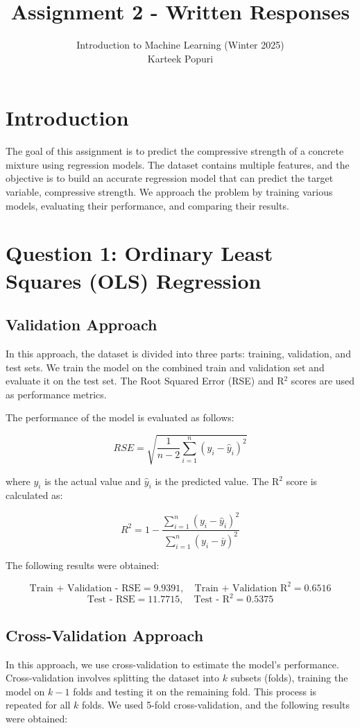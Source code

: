 \documentclass[a4paper,12pt]{article}
\title{Assignment 2 - Written Responses}
\author{Introduction to Machine Learning (Winter 2025)\\ Karteek Popuri}
\date{}
\begin{document}
\maketitle



\section*{Introduction}
The goal of this assignment is to predict the compressive strength of a concrete mixture using regression models. The dataset contains multiple features, and the objective is to build an accurate regression model that can predict the target variable, compressive strength. We approach the problem by training various models, evaluating their performance, and comparing their results.

\section*{Question 1: Ordinary Least Squares (OLS) Regression}

\subsection*{Validation Approach}
In this approach, the dataset is divided into three parts: training, validation, and test sets. We train the model on the combined train and validation set and evaluate it on the test set. The Root Squared Error (RSE) and R\(^2\) scores are used as performance metrics.

The performance of the model is evaluated as follows:

\[
RSE = \sqrt{\frac{1}{n-2}\sum_{i=1}^{n} (y_i - \hat{y}_i)^2}
\]


where \(y_i\) is the actual value and \(\hat{y}_i\) is the predicted value. The R\(^2\) score is calculated as:

\[
R^2 = 1 - \frac{\sum_{i=1}^{n} (y_i - \hat{y}_i)^2}{\sum_{i=1}^{n} (y_i - \bar{y})^2}
\]

The following results were obtained:

\[
\text{Train + Validation - RSE} = 9.9391, \quad \text{Train + Validation R}^2 = 0.6516
\]
\[
\text{Test - RSE} = 11.7715, \quad \text{Test - R}^2 = 0.5375
\]

\subsection*{Cross-Validation Approach}
In this approach, we use cross-validation to estimate the model's performance. Cross-validation involves splitting the dataset into \(k\) subsets (folds), training the model on \(k-1\) folds and testing it on the remaining fold. This process is repeated for all \(k\) folds. We used 5-fold cross-validation, and the following results were obtained:
\end{document}
